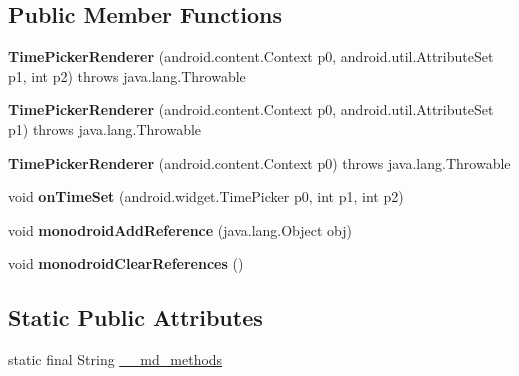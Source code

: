 \subsection*{Public Member Functions}
\begin{DoxyCompactItemize}
\item 
\mbox{\label{classmd5b60ffeb829f638581ab2bb9b1a7f4f3f_1_1TimePickerRenderer_aea08e098874d7b721d4936ff36f29e0e}} 
{\bfseries Time\+Picker\+Renderer} (android.\+content.\+Context p0, android.\+util.\+Attribute\+Set p1, int p2)  throws java.\+lang.\+Throwable 	
\item 
\mbox{\label{classmd5b60ffeb829f638581ab2bb9b1a7f4f3f_1_1TimePickerRenderer_a66248b9a92ae22c9d0929971dabb0092}} 
{\bfseries Time\+Picker\+Renderer} (android.\+content.\+Context p0, android.\+util.\+Attribute\+Set p1)  throws java.\+lang.\+Throwable 	
\item 
\mbox{\label{classmd5b60ffeb829f638581ab2bb9b1a7f4f3f_1_1TimePickerRenderer_a88438e043108dffa9cb1d613995b7aa1}} 
{\bfseries Time\+Picker\+Renderer} (android.\+content.\+Context p0)  throws java.\+lang.\+Throwable 	
\item 
\mbox{\label{classmd5b60ffeb829f638581ab2bb9b1a7f4f3f_1_1TimePickerRenderer_ac2ef26492e19e4ba5a31033d11ae8a6a}} 
void {\bfseries on\+Time\+Set} (android.\+widget.\+Time\+Picker p0, int p1, int p2)
\item 
\mbox{\label{classmd5b60ffeb829f638581ab2bb9b1a7f4f3f_1_1TimePickerRenderer_a09ae55d639cff012f899b5f0d3854c43}} 
void {\bfseries monodroid\+Add\+Reference} (java.\+lang.\+Object obj)
\item 
\mbox{\label{classmd5b60ffeb829f638581ab2bb9b1a7f4f3f_1_1TimePickerRenderer_adc6b30a3a46eab5938559e8d3c3674c2}} 
void {\bfseries monodroid\+Clear\+References} ()
\end{DoxyCompactItemize}
\subsection*{Static Public Attributes}
\begin{DoxyCompactItemize}
\item 
static final String \hyperlink{classmd5b60ffeb829f638581ab2bb9b1a7f4f3f_1_1TimePickerRenderer_a3c77da783a54f125d97047436f80a34c}{\+\_\+\+\_\+md\+\_\+methods}
\end{DoxyCompactItemize}
